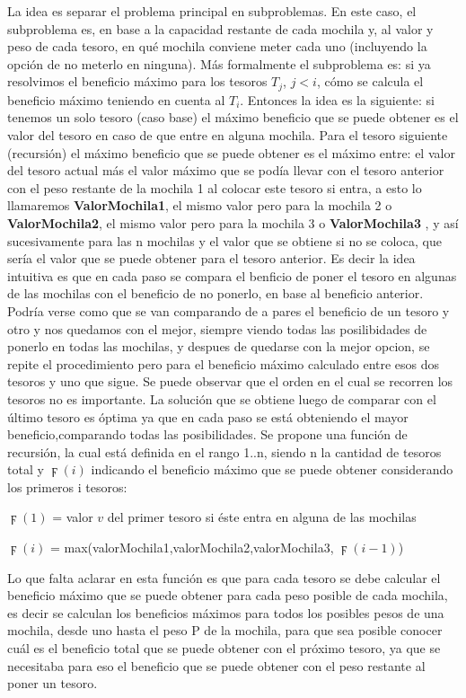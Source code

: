     La idea es separar el problema principal en subproblemas. En este caso, el subproblema es, en base a la capacidad restante de cada mochila y, al valor y peso de cada tesoro, en qué mochila conviene meter cada uno (incluyendo la opción de no meterlo en ninguna). Más formalmente el subproblema es: si ya resolvimos el beneficio máximo para los tesoros $T_{j}$, $j < i$, cómo se calcula el beneficio máximo teniendo en cuenta al $T_{i}$. Entonces la idea es la siguiente: si tenemos un solo tesoro (caso base) el máximo beneficio que se puede obtener es el valor del tesoro en caso de que entre en alguna mochila. Para el tesoro siguiente (recursión) el máximo beneficio que se puede obtener es el máximo entre: el valor del tesoro actual más el valor máximo que se podía llevar con el tesoro anterior con el peso restante de la mochila 1 al colocar este tesoro si entra, a esto lo llamaremos \textbf{ValorMochila1}, el mismo valor pero para la mochila 2 o \textbf{ValorMochila2}, el mismo valor pero para la mochila 3 o \textbf{ValorMochila3} , y así sucesivamente para las n mochilas y el valor que se obtiene si no se coloca, que sería el valor que se puede obtener para el tesoro anterior. Es decir la idea intuitiva es que en cada paso se compara el benficio de poner el tesoro en algunas de las mochilas con el beneficio de no ponerlo, en base al beneficio anterior. Podría verse como que se van comparando de a pares el beneficio de un tesoro y otro y nos quedamos con el mejor, siempre viendo todas las posilibidades de ponerlo en todas las mochilas, y despues de quedarse con la mejor opcion, se repite el procedimiento pero para el beneficio máximo calculado entre esos dos tesoros y uno que sigue. Se puede observar que el orden en el cual se recorren los tesoros no es importante. La solución que se obtiene luego de comparar con el último tesoro es óptima ya que en cada paso se está obteniendo el mayor beneficio,comparando todas las posibilidades. Se propone una función de recursión, la cual está definida en el rango 1..n, siendo n la cantidad de tesoros total y $\digamma(i)$ indicando el beneficio máximo que se puede obtener considerando los primeros i tesoros: \par

    $\digamma(1)$ = valor $v$ del primer tesoro si éste entra en alguna de las mochilas

    $\digamma(i)$ = max(valorMochila1,valorMochila2,valorMochila3, $\digamma(i-1)$)

    Lo que falta aclarar en esta función es que para cada tesoro se debe calcular el beneficio máximo que se puede obtener para cada peso posible de cada mochila, es decir se calculan los beneficios máximos para todos los posibles pesos de una mochila, desde uno hasta el peso P de la mochila, para que sea posible conocer cuál es el beneficio total que se puede obtener con el próximo tesoro, ya que se necesitaba para eso el beneficio que se puede obtener con el peso restante al poner un tesoro. 

